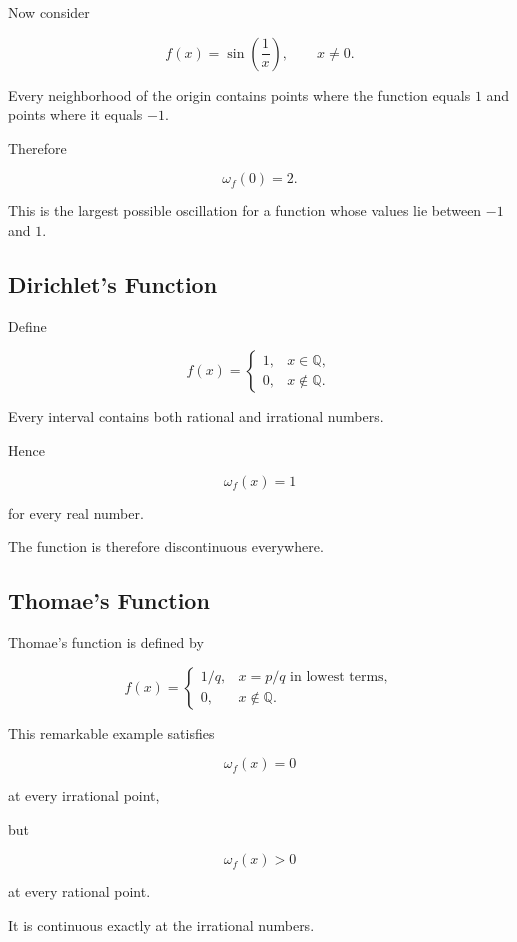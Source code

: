\documentclass{essay}
\begin{document}
Now consider

\[
f(x)
=
\sin\left(\frac1x\right),
\qquad x\neq0.
\]

Every neighborhood of the origin contains points where the function equals
$1$ and points where it equals $-1$.

Therefore

\[
\omega_f(0)=2.
\]

This is the largest possible oscillation for a function whose values lie between
$-1$ and $1$.


\subsection{Dirichlet's Function}

Define

\[
f(x)=
\begin{cases}
1,&x\in\mathbb{Q},\\
0,&x\notin\mathbb{Q}.
\end{cases}
\]

Every interval contains both rational and irrational numbers.

Hence

\[
\omega_f(x)=1
\]

for every real number.

The function is therefore discontinuous everywhere.


\subsection{Thomae's Function}

Thomae's function is defined by

\[
f(x)=
\begin{cases}
1/q,
&
x=p/q
\text{ in lowest terms},\\
0,
&
x\notin\mathbb{Q}.
\end{cases}
\]

This remarkable example satisfies

\[
\omega_f(x)=0
\]

at every irrational point,

but

\[
\omega_f(x)>0
\]

at every rational point.

It is continuous exactly at the irrational numbers.
\end{document}
